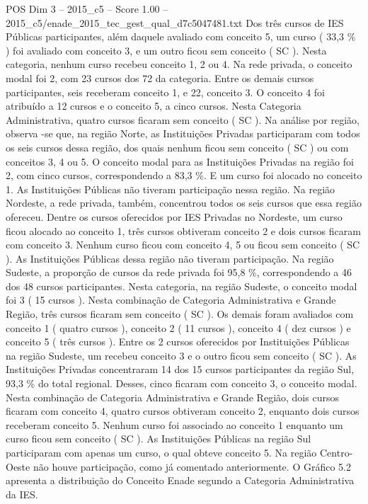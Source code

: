 \begin{textsample}{POS Dim 3 – 2015\_c5 – Score 1.00 – 2015\_c5/enade\_2015\_tec\_gest\_qual\_d7c5047481.txt}
Dos três cursos de IES Públicas participantes, além daquele avaliado com conceito 5, um curso ( 33,3 \% ) foi avaliado com conceito 3, e um outro ficou sem conceito ( SC ).
Nesta categoria, nenhum curso recebeu conceito 1, 2 ou 4.
Na rede privada, o conceito modal foi 2, com 23 cursos dos 72 da categoria.
Entre os demais cursos participantes, seis receberam conceito 1, e 22, conceito 3.
O conceito 4 foi atribuído a 12 cursos e o conceito 5, a cinco cursos.
Nesta Categoria Administrativa, quatro cursos ficaram sem conceito ( SC ).
Na análise por região, observa -se que, na região Norte, as Instituições Privadas participaram com todos os seis cursos dessa região, dos quais nenhum ficou sem conceito ( SC ) ou com conceitos 3, 4 ou 5.
O conceito modal para as Instituições Privadas na região foi 2, com cinco cursos, correspondendo a 83,3 \%.
E um curso foi alocado no conceito 1.
As Instituições Públicas não tiveram participação nessa região.
Na região Nordeste, a rede privada, também, concentrou todos os seis cursos que essa região ofereceu.
Dentre os cursos oferecidos por IES Privadas no Nordeste, um curso ficou alocado ao conceito 1, três cursos obtiveram conceito 2 e dois cursos ficaram com conceito 3.
Nenhum curso ficou com conceito 4, 5 ou ficou sem conceito ( SC ).
As Instituições Públicas dessa região não tiveram participação.
Na região Sudeste, a proporção de cursos da rede privada foi 95,8 \%, correspondendo a 46 dos 48 cursos participantes.
Nesta categoria, na região Sudeste, o conceito modal foi 3 ( 15 cursos ).
Nesta combinação de Categoria Administrativa e Grande Região, três cursos ficaram sem conceito ( SC ).
Os demais foram avaliados com conceito 1 ( quatro cursos ), conceito 2 ( 11 cursos ), conceito 4 ( dez cursos ) e conceito 5 ( três cursos ).
Entre os 2 cursos oferecidos por Instituições Públicas na região Sudeste, um recebeu conceito 3 e o outro ficou sem conceito ( SC ).
As Instituições Privadas concentraram 14 dos 15 cursos participantes da região Sul, 93,3 \% do total regional.
Desses, cinco ficaram com conceito 3, o conceito modal.
Nesta combinação de Categoria Administrativa e Grande Região, dois cursos ficaram com conceito 4, quatro cursos obtiveram conceito 2, enquanto dois cursos receberam conceito 5.
Nenhum curso foi associado ao conceito 1 enquanto um curso ficou sem conceito ( SC ).
As Instituições Públicas na região Sul participaram com apenas um curso, o qual obteve conceito 5.
Na região Centro-Oeste não houve participação, como já comentado anteriormente.
O Gráfico 5.2 apresenta a distribuição do Conceito Enade segundo a Categoria Administrativa da IES.

\end{textsample}
